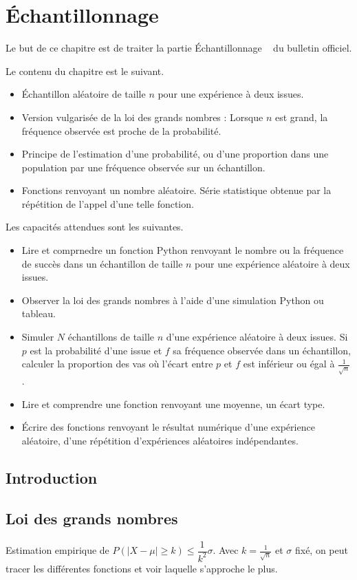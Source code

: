 
\chapter{Échantillonnage}

Le but de ce chapitre est de traiter la partie \og Échantillonnage \fg~ du bulletin officiel.

Le contenu du chapitre est le suivant.
	\begin{itemize}
		\item Échantillon aléatoire de taille $n$ pour une expérience à deux issues.
		\item Version vulgarisée de la loi des grands nombres : \og Lorsque $n$ est grand, la fréquence observée est proche de la probabilité. \fg
		\item Principe de l'estimation d'une probabilité, ou d'une proportion dans une population par une fréquence observée sur un échantillon.
		\item Fonctions renvoyant un nombre aléatoire. Série statistique obtenue par la répétition de l'appel d'une telle fonction.
	\end{itemize}

Les capacités attendues sont les suivantes.
	\begin{itemize}
		\item Lire et comprnedre un fonction Python renvoyant le nombre ou la fréquence de succès dans un échantillon de taille $n$ pour une expérience aléatoire à deux issues.
		\item Observer la loi des grands nombres à l'aide d'une simulation Python ou tableau.
		\item Simuler $N$ échantillons de taille $n$ d'une expérience aléatoire à deux issues. Si $p$ est la probabilité d'une issue et $f$ sa fréquence observée dans un échantillon, calculer la proportion des vas où l'écart entre $p$ et $f$ est inférieur ou égal à $\frac1{\sqrt{n}}$.
		\item Lire et comprendre une fonction renvoyant une moyenne, un écart type.
		\item Écrire des fonctions renvoyant le résultat numérique d'une expérience aléatoire, d'une répétition d'expériences aléatoires indépendantes.
	\end{itemize}

\section{Introduction}

\section{Loi des grands nombres}

Estimation empirique de $P(|X - \mu| \geq k) \leq \dfrac1{k^2} \sigma$.
Avec $k = \frac1{\sqrt{n}}$ et $\sigma$ fixé, on peut tracer les différentes fonctions et voir laquelle s'approche le plus.